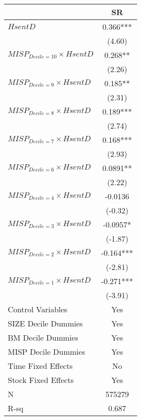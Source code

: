 \begin{tabular}{lc}
\toprule
      & SR \\
\midrule
$HsentD$ & 0.366*** \\
      & (4.60) \\
$MISP_{Decile = 10} \times HsentD$ & 0.268** \\
      & (2.26) \\
$MISP_{Decile = 9} \times HsentD$ & 0.185** \\
      & (2.31) \\
$MISP_{Decile = 8} \times HsentD$ & 0.189*** \\
      & (2.74) \\
$MISP_{Decile = 7} \times HsentD$ & 0.168*** \\
      & (2.93) \\
$MISP_{Decile = 6} \times HsentD$ & 0.0891** \\
      & (2.22) \\
$MISP_{Decile = 4} \times HsentD$ & -0.0136 \\
      & (-0.32) \\
$MISP_{Decile = 3} \times HsentD$ & -0.0957* \\
      & (-1.87) \\
$MISP_{Decile = 2} \times HsentD$ & -0.164*** \\
      & (-2.81) \\
$MISP_{Decile = 1} \times HsentD$ & -0.271*** \\
      & (-3.91) \\
\midrule
Control Variables & Yes \\
SIZE Decile Dummies & Yes \\
BM Decile Dummies & Yes \\
MISP Decile Dummies & Yes \\
Time Fixed Effects & No \\
Stock Fixed Effects & Yes \\
N     & 575279 \\
R-sq  & 0.687 \\
\bottomrule
\end{tabular}%
